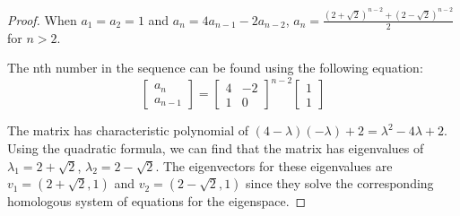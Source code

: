 \begin{proof} 
    When $a_1 = a_2 = 1$ and $a_n = 4a_{n-1} - 2a_{n-2}$,
    $a_n =  \frac{(2+\sqrt{2})^{n-2} + (2-\sqrt{2})^{n-2}}{2}$ for $n>2$. \gap

    The nth number in the sequence can be found using the following equation:
    \[
    \begin{bmatrix} a_n \\ a_{n-1} \end{bmatrix} =
    \begin{bmatrix}
        4 & -2 \\
        1 & 0
    \end{bmatrix}^{n-2}
    \begin{bmatrix} 1 \\ 1 \end{bmatrix}
    \]

    The matrix has characteristic polynomial of
    $(4-\lambda)(-\lambda) + 2 = \lambda^2 - 4\lambda + 2$.
    Using the quadratic formula, we can find that
    the matrix has eigenvalues of $\lambda_1 = 2+\sqrt{2}$, $\lambda_2 = 2-\sqrt{2}$.
    The eigenvectors for these eigenvalues are
    $v_1 = (2+\sqrt{2}, 1)$ and $v_2 = (2-\sqrt{2}, 1)$
    since they solve the corresponding homologous system of equations for the eigenspace.\gap


\end{proof}
